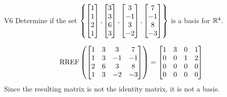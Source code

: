 \begin{problem}{V6}
Determine if the set
\(\left\{
  \begin{bmatrix} 1 \\ 1 \\ 2 \\1 \end{bmatrix},
  \begin{bmatrix} 3 \\ 3 \\ 6 \\ 3 \end{bmatrix},
  \begin{bmatrix}3 \\ -1 \\ 3 \\ -2\end{bmatrix},
  \begin{bmatrix} 7 \\ -1 \\ 8 \\ -3 \end{bmatrix}
\right\}\) is a basis for \(\mathbb{R}^4\).
\end{problem}
\begin{solution}
\[\operatorname{RREF}\left(\begin{bmatrix} 1 & 3 & 3 & 7 \\ 1 & 3 & -1 & -1 \\ 2 & 6 & 3 & 8 \\ 1 & 3 & -2 & -3 \end{bmatrix}\right) = \begin{bmatrix} 1 & 3 & 0 & 1 \\ 0 & 0 & 1 & 2 \\ 0 & 0 & 0 & 0 \\ 0 & 0 & 0 & 0  \end{bmatrix}\]
Since the resulting matrix is not the identity matrix, it is not a basis.
\end{solution}

